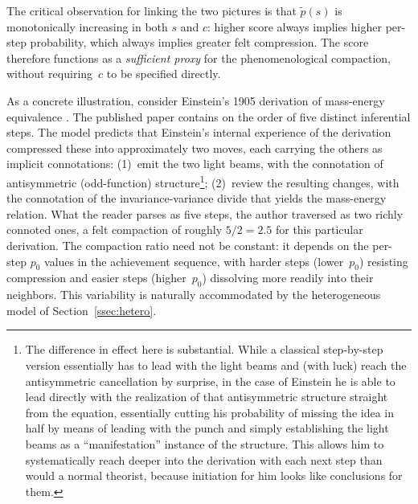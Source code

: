\documentclass{article}
\begin{document}
The critical observation for linking the two pictures is that
$\widetilde{p}(s)$ is monotonically increasing in both $s$ and $c$:
higher score always implies higher per-step probability, which always
implies greater felt compression. The score therefore functions as a
\emph{sufficient proxy} for the phenomenological compaction, without
requiring~$c$ to be specified directly.

As a concrete illustration, consider Einstein's 1905 derivation of
mass-energy equivalence \cite{einstein1905inertia}. The published paper
contains on the order of five distinct inferential steps. The model
predicts that Einstein's internal experience of the derivation compressed
these into approximately two moves, each carrying the others as implicit
connotations: (1)~emit the two light beams, with the connotation of
antisymmetric (odd-function) structure\footnote{The difference in effect here is substantial. While a classical step-by-step version essentially has to lead with the light beams and (with luck) reach the antisymmetric cancellation by surprise, in the case of Einstein he is able to lead directly with the realization of that antisymmetric structure straight from the equation, essentially cutting his probability of missing the idea in half by means of leading with the punch and simply establishing the light beams as a “manifestation” instance of the structure. This allows him to systematically reach deeper into the derivation with each next step than would a normal theorist, because initiation for him looks like conclusions for them.}; (2)~review the resulting changes,
with the connotation of the invariance-variance divide that yields the
mass-energy relation. What the reader parses as five steps, the author
traversed as two richly connoted ones, a felt compaction of roughly
$5/2 = 2.5$ for this particular derivation. The compaction ratio need
not be constant: it depends on the per-step $p_0$ values in the
achievement sequence, with harder steps (lower~$p_0$) resisting
compression and easier steps (higher~$p_0$) dissolving more readily
into their neighbors. This variability is naturally accommodated by the
heterogeneous model of Section~\ref{ssec:hetero}.
\end{document}

